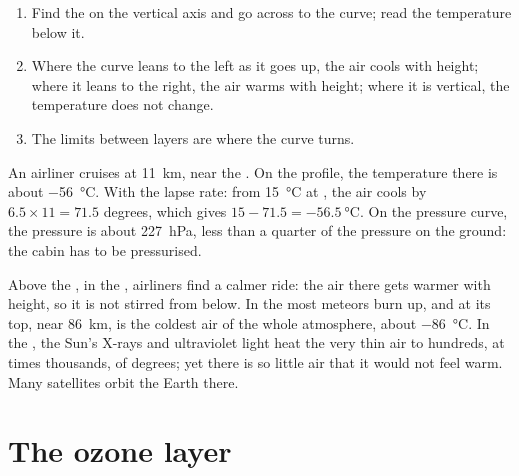 \begin{method}\label{met:g8:the-atmosphere:profile}
\begin{enumerate}
  \item Find the  on the vertical axis and go across to the
        curve; read the temperature below it.
  \item Where the curve leans to the left as it goes up, the air cools
        with height; where it leans to the right, the air warms with
        height; where it is vertical, the temperature does not change.
  \item The limits between layers are where the curve turns.
\end{enumerate}
\end{method}

\begin{example}\label{ex:g8:the-atmosphere:airliner}
An airliner cruises at \qty{11}{km}, near the . On the
profile, the temperature there is about \qty{-56}{\degreeCelsius}. With
the lapse rate: from \qty{15}{\degreeCelsius} at , the air cools
by $6.5 \times 11 = 71.5$ degrees, which gives $15 - 71.5 =
\qty{-56.5}{\degreeCelsius}$. On the pressure curve, the pressure is
about \qty{227}{hPa}, less than a quarter of the pressure on the ground:
the cabin has to be pressurised.
\end{example}

Above the , in the , airliners find a calmer ride:
the air there gets warmer with height, so it is not stirred from below.
In the  most meteors burn up, and at its top, near
\qty{86}{km}, is the coldest air of the whole atmosphere, about
\qty{-86}{\degreeCelsius}. In the , the Sun's X-rays and
ultraviolet light heat the very thin air to hundreds, at times
thousands, of degrees; yet there is so little air that it would not feel
warm. Many satellites orbit the Earth there.

\section{The ozone layer}

